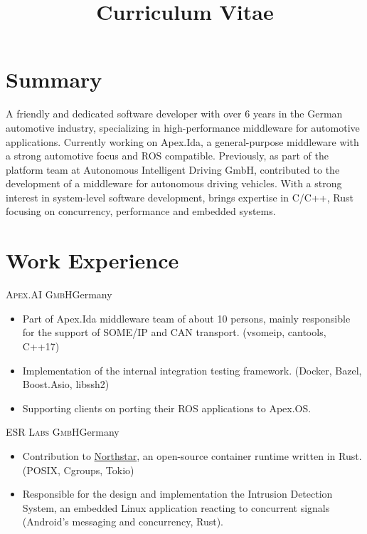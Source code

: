 \documentclass[10pt]{moderncv}
\title{Curriculum Vitae}
\begin{document}
\maketitle
\vspace*{-1cm}

\section{Summary}

A friendly and dedicated software developer with over 6 years in the German automotive industry, specializing in
high-performance middleware for automotive applications. Currently working on Apex.Ida, a general-purpose middleware with a
strong automotive focus and ROS compatible. Previously, as part of the platform team at Autonomous Intelligent Driving GmbH,
contributed to the development of  a middleware for autonomous driving vehicles. With a strong interest in system-level software
development, brings expertise in C/C++, Rust focusing on concurrency, performance and embedded systems.

\section{Work Experience}

{\textsc{Apex.AI GmbH}}{Germany}{}{%
\begin{itemize}
    \item Part of Apex.Ida middleware team of about 10 persons, mainly responsible for the support of SOME/IP and CAN transport.
        (vsomeip, cantools, C++17)
    \item Implementation of the internal integration testing framework. (Docker, Bazel, Boost.Asio, libssh2)
    \item Supporting clients on porting their ROS applications to Apex.OS.
\end{itemize}
}

{\textsc{ESR Labs GmbH}}{Germany}{}{%
\begin{itemize}
    \item Contribution to \href{https://github.com/esrlabs/northstar}{Northstar}, an open-source container runtime written in
        Rust. (POSIX, Cgroups, Tokio)
    \item Responsible for the design and implementation the Intrusion Detection System, an embedded Linux application reacting
        to concurrent signals (Android's messaging and concurrency, Rust).
\end{itemize}
}
\end{document}
